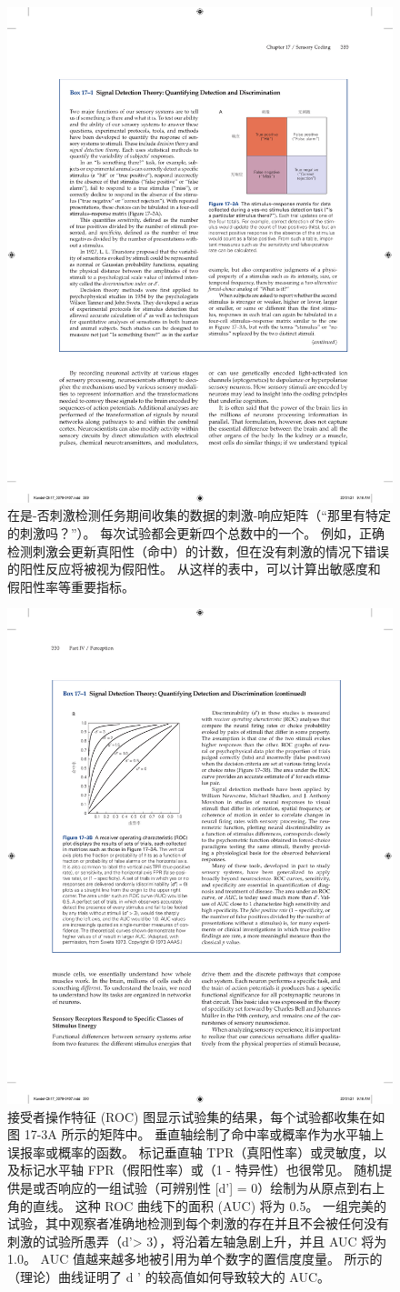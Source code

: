 \begin{figure}[htbp]
	\centering
	\includegraphics[width=0.5\linewidth]{chap17/fig_17_3_a}
	\caption{在是-否刺激检测任务期间收集的数据的刺激-响应矩阵（“那里有特定的刺激吗？”）。
		每次试验都会更新四个总数中的一个。
		例如，正确检测刺激会更新真阳性（命中）的计数，但在没有刺激的情况下错误的阳性反应将被视为假阳性。
		从这样的表中，可以计算出敏感度和假阳性率等重要指标。}
	\label{fig:17_3_a}
\end{figure}

\begin{figure}[htbp]
	\centering
	\includegraphics[width=0.5\linewidth]{chap17/fig_17_3_b}
	\caption{接受者操作特征 (ROC) 图显示试验集的结果，每个试验都收集在如图 17-3A 所示的矩阵中。
		垂直轴绘制了命中率或概率作为水平轴上误报率或概率的函数。
		标记垂直轴 TPR（真阳性率）或灵敏度，以及标记水平轴 FPR（假阳性率）或（1 - 特异性）也很常见。
		随机提供是或否响应的一组试验（可辨别性 [d'] = 0）绘制为从原点到右上角的直线。
		这种 ROC 曲线下的面积 (AUC) 将为 0.5。
		一组完美的试验，其中观察者准确地检测到每个刺激的存在并且不会被任何没有刺激的试验所愚弄（d'> 3），将沿着左轴急剧上升，并且 AUC 将为 1.0。
		AUC 值越来越多地被引用为单个数字的置信度度量。
		所示的（理论）曲线证明了 d ' 的较高值如何导致较大的 AUC\cite{swets1973relative}。}
	\label{fig:17_3_b}
\end{figure}


